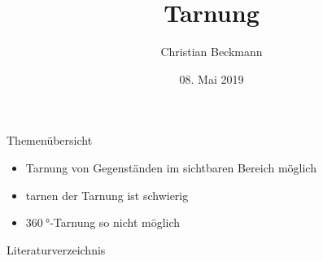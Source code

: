 \documentclass[aspectratio=169, 9pt, bibliography=totoc]{beamer}
\title{Tarnung}
\author[C.~Beckmann]{Christian Beckmann}
\institute[Seminar Moderne Optik]{Seminar Moderne Optik}
\date{08. Mai 2019}
\begin{document}
\maketitle

\begin{frame}{Themen\"ubersicht}
  \tableofcontents
\end{frame}




\begin{frame}
  \begin{itemize}
    \item Tarnung von Gegenständen im sichtbaren Bereich möglich
    \item tarnen der Tarnung ist schwierig
    \item $\SI{360}{\degree}$-Tarnung so nicht m\"oglich
  \end{itemize}
\end{frame}

\begin{frame}{Literaturverzeichnis}
	\printbibliography
\end{frame}
\end{document}
